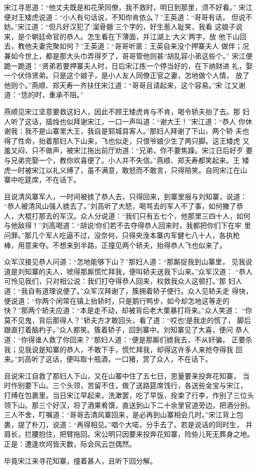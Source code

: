 宋江寻思道：“他丈夫既是和花荣同僚，我不救时，明日到那里，须不好看。”
宋江便对王矮虎说道：“小人有句话说，不知你肯依么？”王英道：“哥哥有话，
但说不妨。”宋江道：“但凡好汉犯了‘溜骨髓’三个字的，好生惹人耻笑，我看
这娘子说来，是个朝廷命官的恭人。怎生看在下薄面，并江湖上‘大义’两字，放
他下山回去，教他夫妻完聚如何？”王英道：“哥哥听禀：王英自来没个押寨夫人
做伴；况兼如今世上，都是那大头巾弄得歹了，哥哥管他则甚?胡乱容小弟这些个。”
宋江便跪一跪道：“贤弟若要押寨夫人时，日后宋江拣一个停当好的，在下纳财进
礼，娶一个伏侍贤弟。只是这个娘子，是小人友人同僚正官之妻，怎地做个人情，
放了他则个。”燕顺、郑天寿一齐扶住宋江道：“哥哥且请起来，这个容易。”宋
江又谢道：“恁的时，重承不阻。”

燕顺见宋江坚意要救这妇人，因此不顾王矮虎肯与不肯，喝令轿夫抬了去。那
妇人听了这话，插烛也似拜谢宋江，一口一声叫道：“谢大王！”宋江道：“恭人
你休谢我：我不是山寨里大王，我自是郓城县客人。”那妇人拜谢了下山，两个轿
夫也得了性命，抬着那妇人下山来，飞也似走，只恨爷娘少生了两只脚。这王矮虎
又羞又闷，只不做声，被宋江拖出前厅劝道：“兄弟，你不要焦躁。宋江日后好歹
要与兄弟完娶一个，教你欢喜便了。小人并不失信。”燕顺、郑天寿都笑起来。王
矮虎一时被宋江以礼义缚了，虽不满意，敢怒而不敢言，只得陪笑。自同宋江在山
寨中吃筵席，不在话下。

且说清风寨军人，一时间被掳了恭人去，只得回来，到寨里报与刘知寨，说道：
“恭人被清风山强人掳去了。”刘高听了大怒，喝骂去的军人不了事，如何撇了恭
人，大棍打那去的军汉。众人分说道：“我们只有五七个，他那里三四十人，如何
与他敌得！”刘高喝道：“胡说!你们若不去夺得恭人回来时，我都把你们下在牢
里问罪。”那几个军人吃逼不过，没奈何，只得央浼本寨内军健七八十人，各执枪
棒，用意来夺。不想来到半路，正撞见两个轿夫，抬得恭人飞也似来了。

众军汉接见恭人问道：“怎地能够下山？”那妇人道：“那厮捉我到山寨里，
见我说道是刘知寨的夫人，唬得那厮慌忙拜我，便叫轿夫送我下山来。”众军汉道：
“恭人可怜见我们，只对相公说：我们打夺得恭人回来，权救我众人这顿打。”那
妇人道：“我自有道理说便了。”众军汉拜谢了，簇拥着轿子便行。众人见轿夫走
得快，便说道：“你两个闲常在镇上抬轿时，只是鹅行鸭步，如今却怎地这等走的
快？”那两个轿夫应道：“本是走不动，却被背后老大栗暴打将来。”众人笑道：
“你莫不见鬼，背后那得人？”轿夫方才敢回头，看了道：“哎也!是我走的慌了，
脚后跟直打着脑杓子。”众人都笑。簇着轿子，回到寨中。刘知寨见了大喜，便问
恭人道：“你得谁人救了你回来？”那妇人道：“便是那厮们掳我去，不从奸骗，
正要杀我；见我说是知寨的恭人，不敢下手，慌忙拜我，却得这许多人来抢夺得我
回来。”刘高听了这话，便叫取十瓶酒，一口猪，赏了众人，不在话下。

且说宋江自救了那妇人下山，又在山寨中住了五七日，思量要来投奔花知寨，
当时作别要下山。三个头领，苦留不住，做了送路筵席饯行，各送些金宝与宋江，
打缚在包裹里。当日宋江早起来，洗漱罢，吃了早饭，拴束了行李，作别了三位头
领下山。那三个好汉，将了酒果肴馔，直送到山下二十余里官道旁边，把酒分别。
三人不舍，叮嘱道：“哥哥去清风寨回来，是必再到山寨相会几时。”宋江背上包
裹，提了朴刀，说道：“再得相见。”唱个大喏，分手去了。若是说话的同时生，
并肩长，拦腰抱住，把臂拖回。宋公明只因要来投奔花知寨，险些儿死无葬身之地。
正是：遭逢坎坷皆天数，际会风云岂偶然。

毕竟宋江来寻花知寨，撞着甚人，且听下回分解。